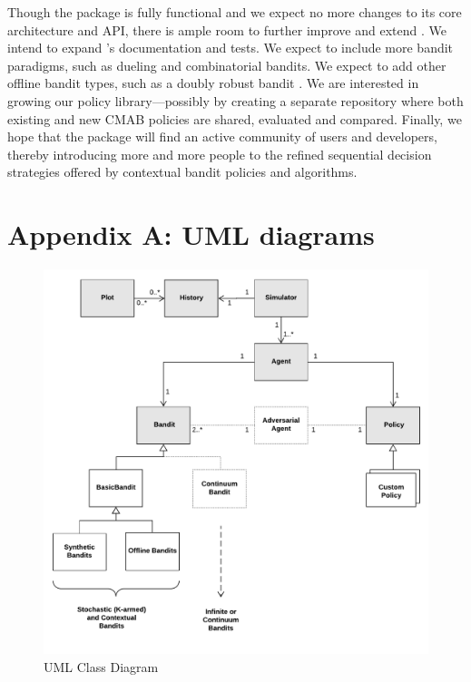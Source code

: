 \documentclass{jss}
\begin{document}
Though the package is fully functional and we expect no more changes to its core architecture and API, there is ample room to further improve and extend . We intend to expand 's documentation and tests. We expect to include more bandit paradigms, such as dueling and combinatorial bandits. We expect to add other offline bandit types, such as a doubly robust bandit \citep{Dudik2011}. We are interested in growing our policy library---possibly by creating a separate repository where both existing and new CMAB policies are shared, evaluated and compared. Finally, we hope that the package will find an active community of users and developers, thereby introducing more and more people to the refined sequential decision strategies offered by contextual bandit policies and algorithms.

%


\newpage

\section{Appendix A: UML diagrams} \label{uml}

\begin{figure}[H]
  \centering
    \includegraphics[width=.99\textwidth]{fig/contextual_class}

      \caption{ UML Class Diagram}
          \label{fig:contextual_class}
\end{figure}
\end{document}
